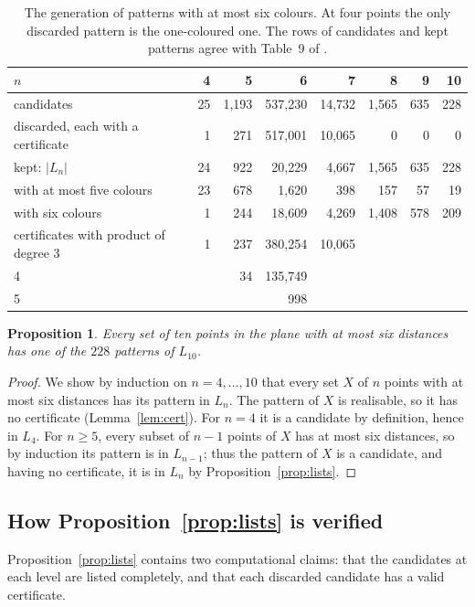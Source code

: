 \documentclass[11pt]{amsart}
\newtheorem{proposition}[theorem]{Proposition}
\theoremstyle{definition}
\theoremstyle{remark}
\begin{document}
\begin{table}[ht]
\centering
\begin{tabular}{@{}lrrrrrrr@{}}
\toprule
$n$ & 4 & 5 & 6 & 7 & 8 & 9 & 10\\
\midrule
candidates & 25 & 1{,}193 & 537{,}230 & 14{,}732 & 1{,}565 & 635 & 228\\
discarded, each with a certificate & 1 & 271 & 517{,}001 & 10{,}065 & 0 & 0 & 0\\
kept: $|L_n|$ & 24 & 922 & 20{,}229 & 4{,}667 & 1{,}565 & 635 & 228\\
\quad with at most five colours & 23 & 678 & 1{,}620 & 398 & 157 & 57 & 19\\
\quad with six colours & 1 & 244 & 18{,}609 & 4{,}269 & 1{,}408 & 578 & 209\\
\midrule
certificates with product of degree 3 & 1 & 237 & 380{,}254 & 10{,}065 & & & \\
\phantom{certificates with product of degree} 4 & & 34 & 135{,}749 & & & & \\
\phantom{certificates with product of degree} 5 & & & 998 & & & & \\
\bottomrule
\end{tabular}
\caption{The generation of patterns with at most six colours. At four points the only discarded pattern
is the one-coloured one. The rows of candidates and kept patterns agree with Table~9 of \cite{SO}.}
\label{tab:levels}
\end{table}

\begin{proposition}\label{prop:A}
Every set of ten points in the plane with at most six distances has one of the $228$ patterns of
$L_{10}$.
\end{proposition}

\begin{proof}
We show by induction on $n=4,\dots,10$ that every set $X$ of $n$ points with at most six distances has its
pattern in $L_n$. The pattern of $X$ is realisable, so it has no certificate (Lemma~\ref{lem:cert}). For
$n=4$ it is a candidate by definition, hence in $L_4$. For $n\ge5$, every subset of $n-1$ points of $X$
has at most six distances, so by induction its pattern is in $L_{n-1}$; thus the pattern of $X$ is a
candidate, and having no certificate, it is in $L_n$ by Proposition~\ref{prop:lists}.
\end{proof}

\subsection{How Proposition~\ref{prop:lists} is verified}\label{sec:verify-lists}
Proposition~\ref{prop:lists} contains two computational claims: that the candidates at each level are
listed completely, and that each discarded candidate has a valid certificate.
\end{document}
